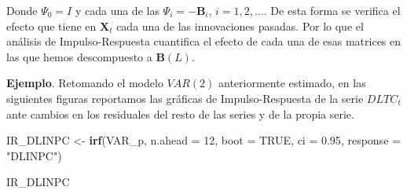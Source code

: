 \documentclass[
]{book}
\newenvironment{Shaded}{\begin{snugshade}}{\end{snugshade}}
\newcommand{\AttributeTok}[1]{\textcolor[rgb]{0.13,0.29,0.53}{#1}}
\newcommand{\ConstantTok}[1]{\textcolor[rgb]{0.56,0.35,0.01}{#1}}
\newcommand{\DecValTok}[1]{\textcolor[rgb]{0.00,0.00,0.81}{#1}}
\newcommand{\FloatTok}[1]{\textcolor[rgb]{0.00,0.00,0.81}{#1}}
\newcommand{\FunctionTok}[1]{\textcolor[rgb]{0.13,0.29,0.53}{\textbf{#1}}}
\newcommand{\NormalTok}[1]{#1}
\newcommand{\OtherTok}[1]{\textcolor[rgb]{0.56,0.35,0.01}{#1}}
\newcommand{\StringTok}[1]{\textcolor[rgb]{0.31,0.60,0.02}{#1}}
\begin{document}
Donde \(\Psi_0 = I\) y cada una de las \(\Psi_i = - \mathbf{B}_i\),
\(i = 1, 2, \ldots\). De esta forma se verifica el efecto que tiene en
\(\mathbf{X}_t\) cada una de las innovaciones pasadas. Por lo que el
análisis de Impulso-Respuesta cuantifica el efecto de cada una de esas
matrices en las que hemos descompuesto a \(\mathbf{B}(L)\).

\textbf{Ejemplo}. Retomando el modelo \(VAR(2)\) anteriormente estimado,
en las siguientes figuras reportamos las gráficas de Impulso-Respuesta
de la serie \(DLTC_t\) ante cambios en los residuales del resto de las
series y de la propia serie.

\begin{Shaded}
\begin{Highlighting}[]
\NormalTok{IR\_DLINPC }\OtherTok{\textless{}{-}} \FunctionTok{irf}\NormalTok{(VAR\_p, }\AttributeTok{n.ahead =} \DecValTok{12}\NormalTok{, }\AttributeTok{boot =} \ConstantTok{TRUE}\NormalTok{, }
                 \AttributeTok{ci =} \FloatTok{0.95}\NormalTok{, }\AttributeTok{response =} \StringTok{"DLINPC"}\NormalTok{)}

\NormalTok{IR\_DLINPC}
\end{Highlighting}
\end{Shaded}
\end{document}
